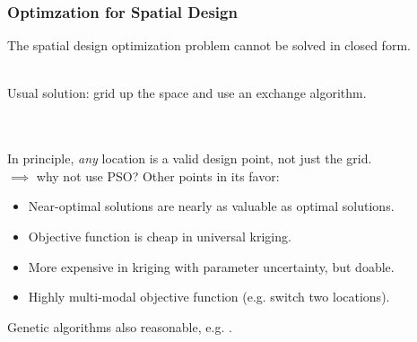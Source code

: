 \documentclass[xcolor=dvipsnames]{beamer}
\begin{document}
\begin{frame}
  \frametitle{Optimzation for Spatial Design}
  The spatial design optimization problem cannot be solved in closed form. \\~\\ \pause

  Usual solution: grid up the space and use an exchange algorithm.\\
 \citep{nychka1998design,wikle1999space,wikle2005dynamic} \\~\\ \pause

  In principle, \emph{any} location is a valid design point, not just the grid.\\
  $\implies$ why not use PSO? \pause Other points in its favor: \\
  \begin{itemize}
  \item Near-optimal solutions are nearly as valuable as optimal solutions.
  \item Objective function is cheap in universal kriging.
  \item More expensive in kriging with parameter uncertainty, but doable.
  \item Highly multi-modal objective function (e.g. switch two locations).\pause
  \end{itemize}

  Genetic algorithms also reasonable, e.g. \citet{hamada2001finding}.
\end{frame}
\end{document}

